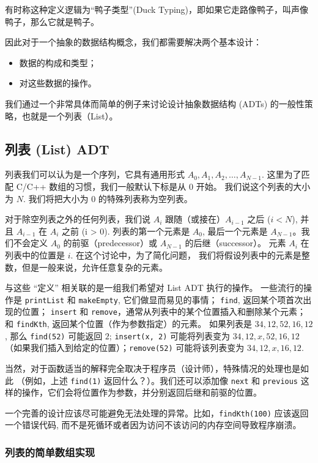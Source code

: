 \documentclass[a4paper]{ctexart}
\theoremstyle{definition}
\theoremstyle{definition}
\begin{document}
有时称这种定义逻辑为“鸭子类型”(Duck Typing)，即如果它走路像鸭子，叫声像鸭子，那么它就是鸭子。

因此对于一个抽象的数据结构概念，我们都需要解决两个基本设计：
\begin{itemize}
  \item 数据的构成和类型；
  \item 对这些数据的操作。
\end{itemize}
我们通过一个非常具体而简单的例子来讨论设计抽象数据结构 (ADTs) 的一般性策略，也就是一个列表（List）。

\subsection{列表 (List) ADT}

列表我们可以认为是一个序列，它具有通用形式 $A_0, A_1, A_2 , \ldots, A_{N-1}$. 
这里为了匹配 C/C++ 数组的习惯，我们一般默认下标是从 $0$ 开始。
我们说这个列表的大小为 $N$. 我们将把大小为 $0$ 的特殊列表称为空列表。

对于除空列表之外的任何列表，我们说 $A_i$ 跟随（或接在）$A_{i-1}$ 之后 ($i < N$), 
并且 $A_{i - 1}$ 在 $A_i$ 之前 (i > 0). 列表的第一个元素是 $A_0$, 
最后一个元素是 $A_{N-1}$。我们不会定义 $A_0$ 的前驱（predecessor）或 $A_{N-1}$ 的后继（successor）。
元素 $A_i$ 在列表中的位置是 $i$. 在这个讨论中，为了简化问题，
我们将假设列表中的元素是整数，但是一般来说，允许任意复杂的元素。

与这些 ``定义'' 相关联的是一组我们希望对 List ADT 执行的操作。
一些流行的操作是 \verb|printList| 和 \verb|makeEmpty|, 它们做显而易见的事情；
\verb|find|, 返回某个项首次出现的位置；
\verb|insert| 和 \verb|remove|，通常从列表中的某个位置插入和删除某个元素；
和 \verb|findKth|, 返回某个位置（作为参数指定）的元素。
如果列表是 $34, 12, 52, 16, 12$, 那么 \verb|find(52)| 可能返回 $2$; 
\verb|insert(x, 2)| 可能将列表变为 $34, 12, x, 52, 16, 12$
（如果我们插入到给定的位置）；\verb|remove(52)| 可能将该列表变为 $34, 12, x, 16, 12$.

当然，对于函数适当的解释完全取决于程序员（设计师），特殊情况的处理也是如此
（例如，上述 \verb|find(1)| 返回什么？）。我们还可以添加像 \verb|next| 和
\verb|previous| 这样的操作，它们会将位置作为参数，并分别返回后继和前驱的位置。

一个完善的设计应该尽可能避免无法处理的异常。比如，\verb|findKth(100)| 应该返回一个错误代码,
而不是死循环或者因为访问不该访问的内存空间导致程序崩溃。

\subsubsection{列表的简单数组实现}
\end{document}
